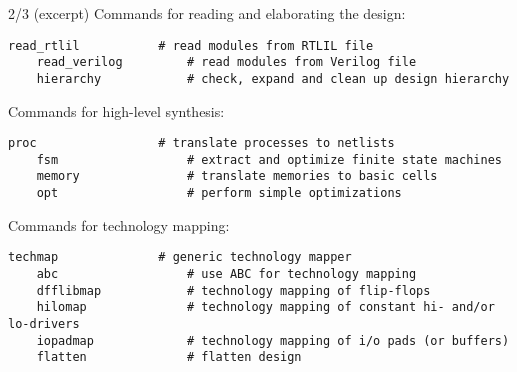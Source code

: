 \begin{frame}[fragile]{\subsecname{} 2/3 \hspace{0pt plus 1 filll} (excerpt)}
Commands for reading and elaborating the design:
\begin{lstlisting}[xleftmargin=1cm, basicstyle=\ttfamily\fontsize{8pt}{10pt}\selectfont, language=ys]
    read_rtlil           # read modules from RTLIL file
    read_verilog         # read modules from Verilog file
    hierarchy            # check, expand and clean up design hierarchy
\end{lstlisting}

\bigskip
Commands for high-level synthesis:
\begin{lstlisting}[xleftmargin=1cm, basicstyle=\ttfamily\fontsize{8pt}{10pt}\selectfont, language=ys]
    proc                 # translate processes to netlists
    fsm                  # extract and optimize finite state machines
    memory               # translate memories to basic cells
    opt                  # perform simple optimizations
\end{lstlisting}

\bigskip
Commands for technology mapping:
\begin{lstlisting}[xleftmargin=1cm, basicstyle=\ttfamily\fontsize{8pt}{10pt}\selectfont, language=ys]
    techmap              # generic technology mapper
    abc                  # use ABC for technology mapping
    dfflibmap            # technology mapping of flip-flops
    hilomap              # technology mapping of constant hi- and/or lo-drivers
    iopadmap             # technology mapping of i/o pads (or buffers)
    flatten              # flatten design
\end{lstlisting}
\end{frame}

